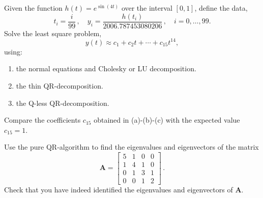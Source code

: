 \begin{exercise}
    Given the function $h(t)=e^{\sin(4t)}$ over the interval $[0,1]$, define the data,
    \[
        t_i = \frac{i}{99}\,,
        \quad  
        y_i = \frac{h(t_i)}{2006.787453080206}\,,
        \quad i=0,\ldots,99.
    \]
    Solve the least square problem,
    \[
        y(t) \approx c_1 + c_2t + \cdots + c_{15} t^{14},
    \]
    using:
    \begin{enumerate}[label=(\alph*)]
        \item the normal equations and Cholesky or LU decomposition.

        \item the thin QR-decomposition.

        \item the Q-less QR-decomposition.
    \end{enumerate}
    Compare the coefficients $c_{15}$ obtained in (a)-(b)-(c) with the expected value $c_{15}=1$.
\end{exercise}

\begin{exercise}
    Use the pure QR-algorithm to find the eigenvalues and eigenvectors of the matrix
    \[
        \mathbf{A}=
        \begin{bmatrix}
            5 & 1 & 0 & 0 \\
            1 & 4 & 1 & 0 \\
            0 & 1 & 3 & 1 \\
            0 & 0 & 1 & 2
        \end{bmatrix}\,.
    \]
    Check that you have indeed identified the eigenvalues and eigenvectors of $\mathbf{A}$.
\end{exercise}
